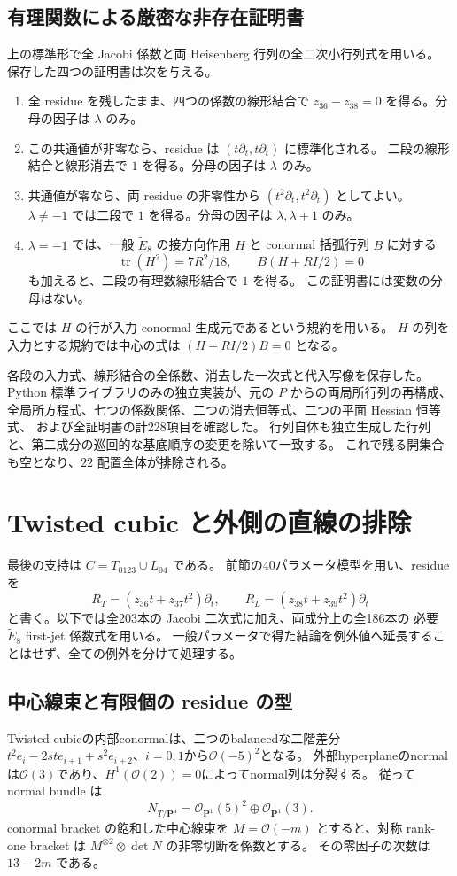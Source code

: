 \documentclass[11pt,a4paper]{ltjsarticle}
\newcommand{\PP}{\mathbf P}\renewcommand{\AA}{\mathbf A}
\newcommand{\OO}{\mathcal O}\newcommand{\FF}{\mathcal F}
\theoremstyle{remark}\newtheorem{remark}[theorem]{注意}
\begin{document}
\subsection{有理関数による厳密な非存在証明書}

上の標準形で全 Jacobi 係数と両 Heisenberg 行列の全二次小行列式を用いる。
保存した四つの証明書は次を与える。
\begin{enumerate}
\item 全 residue を残したまま、四つの係数の線形結合で
$z_{36}-z_{38}=0$ を得る。分母の因子は $\lambda$ のみ。
\item この共通値が非零なら、residue は $(t\partial_t,t\partial_t)$ に標準化される。
二段の線形結合と線形消去で $1$ を得る。分母の因子は $\lambda$ のみ。
\item 共通値が零なら、両 residue の非零性から
$(t^2\partial_t,t^2\partial_t)$ としてよい。
$\lambda\ne-1$ では二段で $1$ を得る。分母の因子は $\lambda,\lambda+1$ のみ。
\item $\lambda=-1$ では、一般 $\widetilde E_8$ の接方向作用 $H$ と
conormal 括弧行列 $B$ に対する
\[
\operatorname{tr}(H^2)=7R^2/18,\qquad B(H+R I/2)=0
\]
も加えると、二段の有理数線形結合で $1$ を得る。
この証明書には変数の分母はない。
\end{enumerate}
ここでは $H$ の行が入力 conormal 生成元であるという規約を用いる。
$H$ の列を入力とする規約では中心の式は $(H+RI/2)B=0$ となる。

各段の入力式、線形結合の全係数、消去した一次式と代入写像を保存した。
Python 標準ライブラリのみの独立実装が、元の $P$ からの両局所行列の再構成、
全局所方程式、七つの係数関係、二つの消去恒等式、二つの平面 Hessian 恒等式、
および全証明書の計228項目を確認した。
行列自体も独立生成した行列と、第二成分の巡回的な基底順序の変更を除いて一致する。
これで残る開集合も空となり、$22$ 配置全体が排除される。


\section{Twisted cubic と外側の直線の排除}\label{sec:31}

最後の支持は $C=T_{0123}\cup L_{04}$ である。
前節の40パラメータ模型を用い、residue を
\[
 R_T=(z_{36}t+z_{37}t^2)\partial_t,\qquad
 R_L=(z_{38}t+z_{39}t^2)\partial_t
\]
と書く。以下では全203本の Jacobi 二次式に加え、両成分上の全186本の
必要 $\widetilde E_8$ first-jet 係数式を用いる。
一般パラメータで得た結論を例外値へ延長することはせず、全ての例外を分けて処理する。

\subsection{中心線束と有限個の residue の型}
Twisted cubicの内部conormalは、二つのbalancedな二階差分
$t^2e_i-2st e_{i+1}+s^2e_{i+2}$、$i=0,1$から$\OO(-5)^2$となる。
外部hyperplaneのnormalは$\OO(3)$であり、$H^1(\OO(2))=0$によってnormal列は分裂する。
従って normal bundle は
\[
 N_{T/\PP^4}=\OO_{\PP^1}(5)^2\oplus\OO_{\PP^1}(3).
\]
conormal bracket の飽和した中心線束を $M=\OO(-m)$ とすると、対称 rank-one bracket は
$M^{\otimes2}\otimes\det N$ の非零切断を係数とする。
その零因子の次数は $13-2m$ である。
\end{document}
